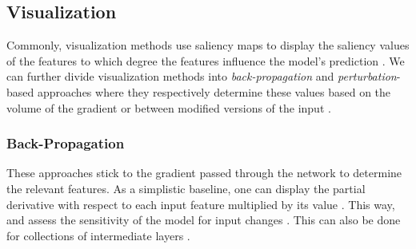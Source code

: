 \subsection{Visualization}
Commonly, visualization methods use saliency maps to display the saliency values of the features \ie to which degree the features influence the model's prediction \citep{xie2020explainable}. We can further divide visualization methods into \emph{back-propagation} and \emph{perturbation}-based approaches where they respectively determine these values based on the volume of the gradient or between modified versions of the input \citep{xie2020explainable}. 

\subsubsection{Back-Propagation}
\label{sec:CAMs}
These approaches stick to the gradient passed through the network to determine the relevant features. As a simplistic baseline, one can display the partial derivative with respect to each input feature multiplied by its value \citep{xie2020explainable}. This way,  \citet{SimonyanVZ13} and \citet{SpringenbergDBR14} assess the sensitivity of the model for input changes \citep{xie2020explainable}. This can also be done for collections of intermediate layers \citep{ShrikumarGK17, MontavonLBSM17, Bach2015, ZeilerF14}.


